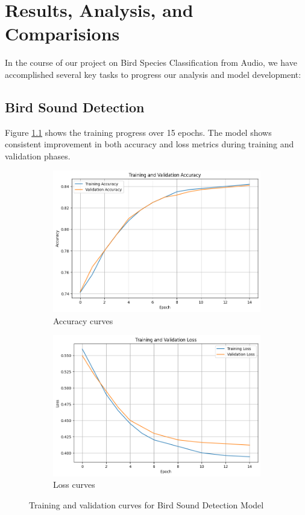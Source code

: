 \chapter{Results, Analysis, and Comparisions}
In the course of our project on Bird Species Classification from Audio, we have
accomplished several key tasks to progress our analysis and model development:

\section{Bird Sound Detection}

Figure \ref{fig:training_curves} shows the training progress over 15 epochs. The model shows consistent improvement in both accuracy and loss metrics during training and validation phases.

\begin{figure}[h!]
      \centering
      \begin{subfigure}{\textwidth}
            \includegraphics[width=\textwidth]{images/det_acc.png}
            \caption{Accuracy curves}
      \end{subfigure}
      \begin{subfigure}{\textwidth}
            \includegraphics[width=\textwidth]{images/det_loss.png}
            \caption{Loss curves}
      \end{subfigure}
      \caption{Training and validation curves for Bird Sound Detection Model}
      \label{fig:training_curves}
\end{figure}

